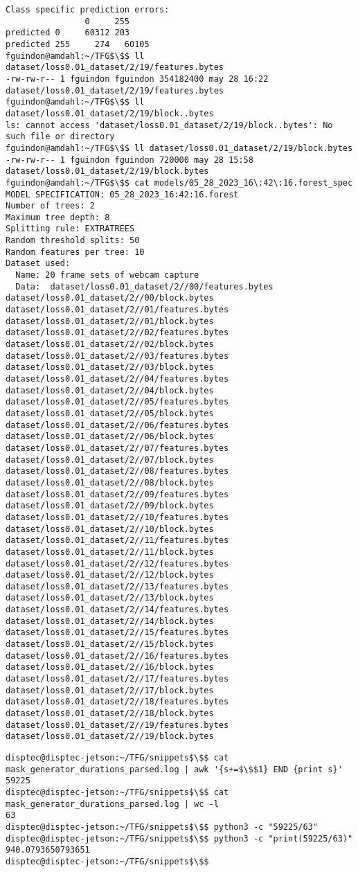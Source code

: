 \documentclass[12pt,oneside]{book}
\begin{document}
\begin{lstlisting}
Class specific prediction errors:
                0     255
predicted 0     60312 203   
predicted 255     274   60105
fguindon@amdahl:~/TFG$\$$ ll dataset/loss0.01_dataset/2/19/features.bytes 
-rw-rw-r-- 1 fguindon fguindon 354182400 may 28 16:22 dataset/loss0.01_dataset/2/19/features.bytes
fguindon@amdahl:~/TFG$\$$ ll dataset/loss0.01_dataset/2/19/block..bytes 
ls: cannot access 'dataset/loss0.01_dataset/2/19/block..bytes': No such file or directory
fguindon@amdahl:~/TFG$\$$ ll dataset/loss0.01_dataset/2/19/block.bytes 
-rw-rw-r-- 1 fguindon fguindon 720000 may 28 15:58 dataset/loss0.01_dataset/2/19/block.bytes
fguindon@amdahl:~/TFG$\$$ cat models/05_28_2023_16\:42\:16.forest_spec 
MODEL SPECIFICATION: 05_28_2023_16:42:16.forest
Number of trees: 2
Maximum tree depth: 8
Splitting rule: EXTRATREES
Random threshold splits: 50
Random features per tree: 10
Dataset used:
  Name: 20 frame sets of webcam capture
  Data:  dataset/loss0.01_dataset/2//00/features.bytes  dataset/loss0.01_dataset/2//00/block.bytes  dataset/loss0.01_dataset/2//01/features.bytes  dataset/loss0.01_dataset/2//01/block.bytes  dataset/loss0.01_dataset/2//02/features.bytes  dataset/loss0.01_dataset/2//02/block.bytes  dataset/loss0.01_dataset/2//03/features.bytes  dataset/loss0.01_dataset/2//03/block.bytes  dataset/loss0.01_dataset/2//04/features.bytes  dataset/loss0.01_dataset/2//04/block.bytes  dataset/loss0.01_dataset/2//05/features.bytes  dataset/loss0.01_dataset/2//05/block.bytes  dataset/loss0.01_dataset/2//06/features.bytes  dataset/loss0.01_dataset/2//06/block.bytes  dataset/loss0.01_dataset/2//07/features.bytes  dataset/loss0.01_dataset/2//07/block.bytes  dataset/loss0.01_dataset/2//08/features.bytes  dataset/loss0.01_dataset/2//08/block.bytes  dataset/loss0.01_dataset/2//09/features.bytes  dataset/loss0.01_dataset/2//09/block.bytes  dataset/loss0.01_dataset/2//10/features.bytes  dataset/loss0.01_dataset/2//10/block.bytes  dataset/loss0.01_dataset/2//11/features.bytes  dataset/loss0.01_dataset/2//11/block.bytes  dataset/loss0.01_dataset/2//12/features.bytes  dataset/loss0.01_dataset/2//12/block.bytes  dataset/loss0.01_dataset/2//13/features.bytes  dataset/loss0.01_dataset/2//13/block.bytes  dataset/loss0.01_dataset/2//14/features.bytes  dataset/loss0.01_dataset/2//14/block.bytes  dataset/loss0.01_dataset/2//15/features.bytes  dataset/loss0.01_dataset/2//15/block.bytes  dataset/loss0.01_dataset/2//16/features.bytes  dataset/loss0.01_dataset/2//16/block.bytes  dataset/loss0.01_dataset/2//17/features.bytes  dataset/loss0.01_dataset/2//17/block.bytes  dataset/loss0.01_dataset/2//18/features.bytes  dataset/loss0.01_dataset/2//18/block.bytes  dataset/loss0.01_dataset/2//19/features.bytes  dataset/loss0.01_dataset/2//19/block.bytes 
\end{lstlisting}

\begin{lstlisting}
disptec@disptec-jetson:~/TFG/snippets$\$$ cat mask_generator_durations_parsed.log | awk '{s+=$\$$1} END {print s}'
59225
disptec@disptec-jetson:~/TFG/snippets$\$$ cat mask_generator_durations_parsed.log | wc -l
63
disptec@disptec-jetson:~/TFG/snippets$\$$ python3 -c "59225/63"
disptec@disptec-jetson:~/TFG/snippets$\$$ python3 -c "print(59225/63)"
940.0793650793651
disptec@disptec-jetson:~/TFG/snippets$\$$
\end{lstlisting}
\end{document}
